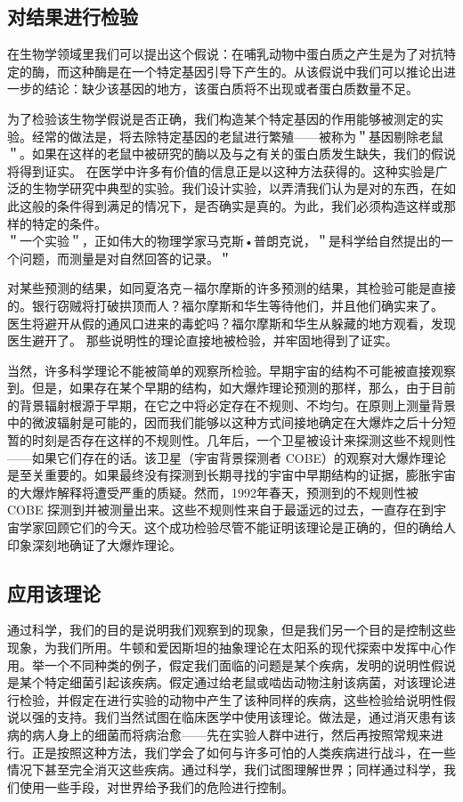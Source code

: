\subsection{对结果进行检验}
在生物学领域里我们可以提出这个假说：在哺乳动物中蛋白质之产生是为了对抗特定的酶，而这种酶是在一个特定基因引导下产生的。从该假说中我们可以推论出进一步的结论：缺少该基因的地方，该蛋白质将不出现或者蛋白质数量不足。

为了检验该生物学假说是否正确，我们构造某个特定基因的作用能够被测定的实验。经常的做法是，将去除特定基因的老鼠进行繁殖——被称为＂基因剔除老鼠＂。如果在这样的老鼠中被研究的酶以及与之有关的蛋白质发生缺失，我们的假说将得到证实。\cite{capecchi1994} 在医学中许多有价值的信息正是以这种方法获得的。这种实验是广泛的生物学研究中典型的实验。我们设计实验，以弄清我们认为是对的东西，在如此这般的条件得到满足的情况下，是否确实是真的。为此，我们必须构造这样或那样的特定的条件。\\
＂一个实验＂，正如伟大的物理学家马克斯•普朗克说，＂是科学给自然提出的一个问题，而测量是对自然回答的记录。＂

对某些预测的结果，如同夏洛克－福尔摩斯的许多预测的结果，其检验可能是直接的。银行窃贼将打破拱顶而人？福尔摩斯和华生等待他们，并且他们确实来了。\cite{doyle1927} 医生将避开从假的通风口进来的毒蛇吗？福尔摩斯和华生从躲藏的地方观看，发现医生避开了。\cite{doyle1927b} 那些说明性的理论直接地被检验，并牢固地得到了证实。

当然，许多科学理论不能被简单的观察所检验。早期宇宙的结构不可能被直接观察到。但是，如果存在某个早期的结构，如大爆炸理论预测的那样，那么，由于目前的背景辐射根源于早期，在它之中将必定存在不规则、不均匀。在原则上测量背景中的微波辐射是可能的，因而我们能够以这种方式间接地确定在大爆炸之后十分短暂的时刻是否存在这样的不规则性。几年后，一个卫星被设计来探测这些不规则性——如果它们存在的话。该卫星（宇宙背景探测者 COBE）的观察对大爆炸理论是至关重要的。如果最终没有探测到长期寻找的宇宙中早期结构的证据，膨胀宇宙的大爆炸解释将遭受严重的质疑。然而，1992年春天，预测到的不规则性被 COBE 探测到并被测量出来。这些不规则性来自于最遥远的过去，一直存在到宇宙学家回顾它们的今天。这个成功检验尽管不能证明该理论是正确的，但的确给人印象深刻地确证了大爆炸理论。

\subsection{应用该理论}
通过科学，我们的目的是说明我们观察到的现象，但是我们另一个目的是控制这些现象，为我们所用。牛顿和爱因斯坦的抽象理论在太阳系的现代探索中发挥中心作用。举一个不同种类的例子，假定我们面临的问题是某个疾病，发明的说明性假说是某个特定细菌引起该疾病。假定通过给老鼠或啮齿动物注射该病菌，对该理论进行检验，并假定在进行实验的动物中产生了该种同样的疾病，这些检验给说明性假说以强的支持。我们当然试图在临床医学中使用该理论。做法是，通过消灭患有该病的病人身上的细菌而将病治愈——先在实验人群中进行，然后再按照常规来进行。正是按照这种方法，我们学会了如何与许多可怕的人类疾病进行战斗，在一些情况下甚至完全消灭这些疾病。通过科学，我们试图理解世界；同样通过科学，我们使用一些手段，对世界给予我们的危险进行控制。

